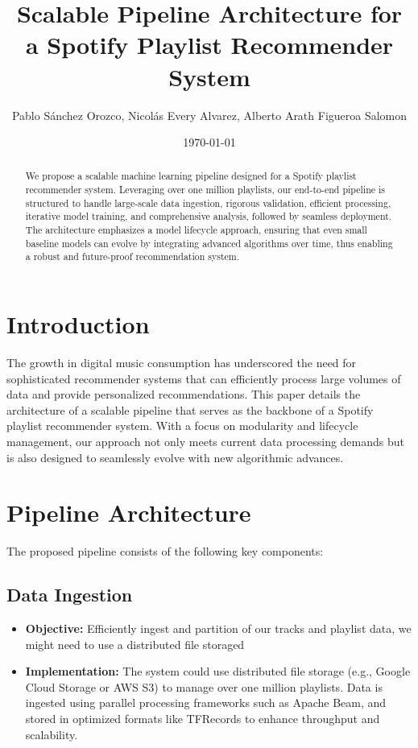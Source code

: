\documentclass{article}
\title{Scalable Pipeline Architecture for a Spotify Playlist Recommender System}
\author{Pablo Sánchez Orozco, Nicolás Every Alvarez, Alberto Arath Figueroa Salomon}
\date{\today}
\begin{document}
\maketitle

\begin{abstract}
We propose a scalable machine learning pipeline designed for a Spotify playlist recommender system. Leveraging over one million playlists, our end-to-end pipeline is structured to handle large-scale data ingestion, rigorous validation, efficient processing, iterative model training, and comprehensive analysis, followed by seamless deployment. The architecture emphasizes a model lifecycle approach, ensuring that even small baseline models can evolve by integrating advanced algorithms over time, thus enabling a robust and future-proof recommendation system.
\end{abstract}

\section{Introduction}
The growth in digital music consumption has underscored the need for sophisticated recommender systems that can efficiently process large volumes of data and provide personalized recommendations. This paper details the architecture of a scalable pipeline that serves as the backbone of a Spotify playlist recommender system. With a focus on modularity and lifecycle management, our approach not only meets current data processing demands but is also designed to seamlessly evolve with new algorithmic advances.

\section{Pipeline Architecture}
The proposed pipeline consists of the following key components:

\subsection{Data Ingestion}
\begin{itemize}
    \item \textbf{Objective:} Efficiently ingest and partition of our tracks and playlist data, we might need to use a distributed file storaged
    \item \textbf{Implementation:} The system could use distributed file storage (e.g., Google Cloud Storage or AWS S3) to manage over one million playlists. Data is ingested using parallel processing frameworks such as Apache Beam, and stored in optimized formats like TFRecords to enhance throughput and scalability.
\end{itemize}
\end{document}
